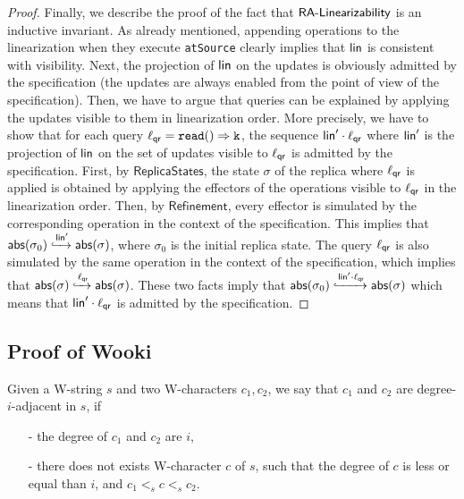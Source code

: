 \begin {proof}
Finally, we describe the proof of the fact that $\mathsf{RA\text{-}Linearizability{}}$ is an inductive invariant. As already mentioned, appending operations to the linearization when they execute \lstinline|atSource| clearly implies that $\mathsf{lin}$ is consistent with visibility. Next, the projection of $\mathsf{lin}$ on the updates is obviously admitted by the specification (the updates are always enabled from the point of view of the specification). Then, we have to argue that queries can be explained by applying the updates visible to them in linearization order. More precisely, we have to show that for each query $\alabel_{\mathsf{qr}} = \alabellongind[{\tt read}]{}{k}{}$, the sequence $\mathsf{lin}'\cdot \ell_{\mathsf{qr}}$ where $\mathsf{lin}'$ is the projection of $\mathsf{lin}$ on the set of updates visible to $\ell_{\mathsf{qr}}$ is admitted by the specification. First, by $\mathsf{ReplicaStates}$, the state $\sigma$ of the replica where $\ell_{\mathsf{qr}}$ is applied is obtained by applying the effectors of the operations visible to $\ell_{\mathsf{qr}}$ in the linearization order. Then, by $\mathsf{Refinement}$, every effector is simulated by the corresponding operation in the context of the specification. This implies that $\mathsf{abs}(\sigma_0)\xhookrightarrow{\ensuremath{\mathsf{lin}}'}\mathsf{abs}(\sigma)$, where $\sigma_0$ is the initial replica state. The query $\ell_{\mathsf{qr}}$ is also simulated by the same operation in the context of the specification, which implies that $\mathsf{abs}(\sigma)\xhookrightarrow{\ensuremath{\ell}_{\mathsf{qr}}}\mathsf{abs}(\sigma)$. These two facts imply that $\mathsf{abs}(\sigma_0)\xhookrightarrow{\ensuremath{\mathsf{lin}}'\cdot \ensuremath{\ell}_{\mathsf{qr}}}\mathsf{abs}(\sigma)$ which means that $\mathsf{lin}'\cdot \ell_{\mathsf{qr}}$ is admitted by the specification.
\end {proof}




\subsection{Proof of Wooki}
\label{subsec:proof of Wooki}


Given a W-string $s$ and two W-characters $c_1,c_2$, we say that $c_1$ and $c_2$ are degree-$i$-adjacent in $s$, if

\begin{itemize}
\setlength{\itemsep}{0.5pt}
\item[-] the degree of $c_1$ and $c_2$ are $i$,

\item[-] there does not exists W-character $c$ of $s$, such that the degree of $c$ is less or equal than $i$, and $c_1 <_s c <_s c_2$.
\end{itemize}


